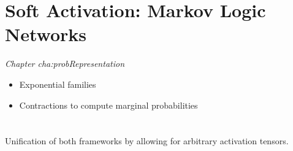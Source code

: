 \documentclass[aps,onecolumn,nofootinbib,pra]{article}
\renewcommand{\charef}[1]{\textit{Chapter #1}}
\begin{document}
    \section{Soft Activation: Markov Logic Networks}

    \charef{cha:probRepresentation}
    \begin{itemize}
        \item Exponential families
        \item Contractions to compute marginal probabilities
    \end{itemize}


    \section{\HybridLogicNetworks{}}

    Unification of both frameworks by allowing for arbitrary activation tensors.
\end{document}

